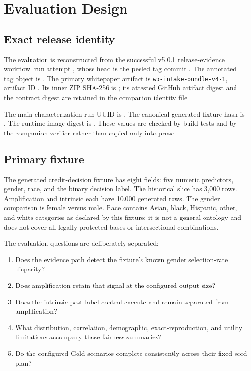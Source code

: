 \section{Evaluation Design}

\subsection{Exact release identity}

The evaluation is reconstructed from the successful v5.0.1 release-evidence workflow, run
\EvidenceRunRaw{} attempt \EvidenceRunAttemptRaw{}, whose head is the peeled tag commit
\IdentityText{\ProductCommitRaw}. The annotated tag object is
\IdentityText{\ProductTagObjectRaw}. The primary whitepaper artifact is
\texttt{wp-intake-bundle-v4-1}, artifact ID \EvidenceArtifactIdRaw{}. Its inner ZIP SHA-256 is
\IdentityText{\EvidenceBundleShaRaw}; its attested GitHub artifact digest and the contract digest
are retained in the companion identity file.

The main characterization run UUID is \IdentityText{\RunId}. The canonical generated-fixture hash
is \IdentityText{\DatasetHash}. The runtime image digest is
\IdentityText{\RuntimeImageDigestRaw}. These values are checked by build tests and by the companion
verifier rather than copied only into prose.

\subsection{Primary fixture}

The generated credit-decision fixture has eight fields: five numeric predictors, gender, race, and
the binary decision label. The historical slice has 3,000 rows. Amplification and intrinsic each
have 10,000 generated rows. The gender comparison is female versus male. Race contains Asian,
black, Hispanic, other, and white categories as declared by this fixture; it is not a general
ontology and does not cover all legally protected bases or intersectional combinations.

The evaluation questions are deliberately separated:

\begin{enumerate}
  \item Does the evidence path detect the fixture's known gender selection-rate disparity?
  \item Does amplification retain that signal at the configured output size?
  \item Does the intrinsic post-label control execute and remain separated from amplification?
  \item What distribution, correlation, demographic, exact-reproduction, and utility limitations
        accompany those fairness summaries?
  \item Do the configured Gold scenarios complete consistently across their fixed seed plan?
\end{enumerate}

